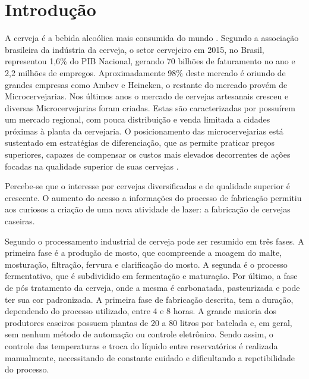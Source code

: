 \tableofcontents*
\cleardoublepage

\textual
	\chapter{Introdução}
A cerveja é a bebida alcoólica mais consumida do mundo \cite{stefenon2012}. Segundo a associação brasileira da indústria da cerveja, o setor cervejeiro em 2015, no Brasil, representou 1,6\% do PIB Nacional, gerando 70 bilhões de faturamento no ano e 2,2 milhões de empregos. Aproximadamente 98\% deste mercado é oriundo de grandes empresas como Ambev e Heineken, o restante do mercado provém de Microcervejarias. Nos últimos anos o mercado de cervejas artesanais cresceu e diversas Microcervejarias foram criadas. Estas são caracterizadas por possuírem um mercado regional, com pouca distribuição e venda limitada a cidades próximas à planta da cervejaria. O posicionamento das microcervejarias está sustentado em estratégias de diferenciação, que as permite praticar preços superiores, capazes de compensar os custos mais elevados decorrentes de ações focadas na qualidade superior de suas cervejas  \cite{stefenon2012}. 

Percebe-se que o interesse por cervejas diversificadas e de qualidade superior é crescente. O aumento do acesso a informações do processo de fabricação permitiu aos curiosos a criação de uma nova atividade de lazer: a fabricação de cervejas caseiras.   

Segundo  o processamento industrial de cerveja pode ser resumido em três fases. A primeira fase é a produção de mosto, que coompreende a moagem do malte, mosturação, filtração, fervura e clarificação do mosto. A segunda é o processo fermentativo, que é subdividido em fermentação e maturação. Por último, a fase de pós tratamento da cerveja, onde a mesma é carbonatada, pasteurizada e pode ter sua cor padronizada. A primeira fase de fabricação descrita, tem a duração, dependendo do processo utilizado, entre 4 e 8 horas. A grande maioria dos produtores caseiros possuem plantas de 20 a 80 litros por batelada e, em geral, sem nenhum método de automação ou controle eletrônico. Sendo assim, o controle das temperaturas e troca do líquido entre reservatórios é realizada manualmente, necessitando de constante cuidado e dificultando a repetibilidade do processo.

